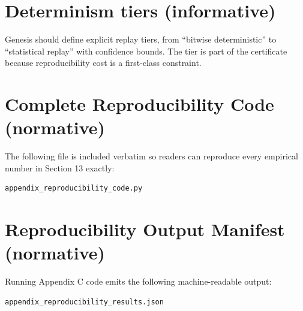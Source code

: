 \documentclass[11pt,a4paper]{article}
\begin{document}
\section{Determinism tiers (informative)}
Genesis should define explicit replay tiers, from ``bitwise deterministic'' to ``statistical replay'' with confidence bounds.
The tier is part of the certificate because reproducibility cost is a first-class constraint.

\section{Complete Reproducibility Code (normative)}
The following file is included verbatim so readers can reproduce every empirical number in Section 13 exactly:
\begin{verbatim}
appendix_reproducibility_code.py
\end{verbatim}


\section{Reproducibility Output Manifest (normative)}
Running Appendix C code emits the following machine-readable output:
\begin{verbatim}
appendix_reproducibility_results.json
\end{verbatim}

\end{document}
